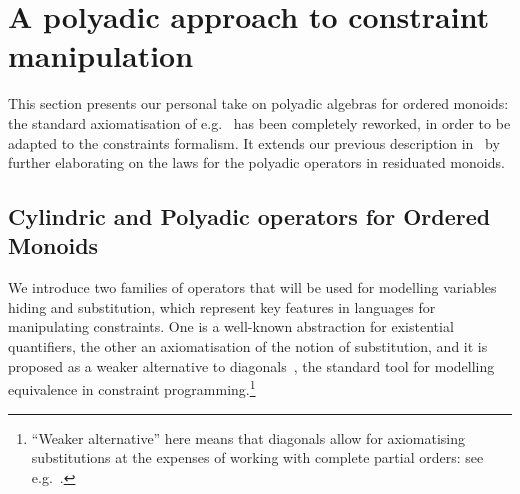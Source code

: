 \documentclass{llncs}
\newcommand{\comment}[1]{}
\def\odiv{\, {\ominus\hspace{-7.7pt} \div} \,}
\begin{document}
\comment{
\begin{example}
\label{notdistr}
Let us consider the monoid $S = \langle \{p,u,n,t\}, \otimes_s, u \rangle$ (with $t$ the top 
of three otherwise unrelated elements): 
$p$ and $n$ intuitively represent the sign of an integer, $t$ tells us that 
the sign cannot be determined, $u$ is the zero
and $\otimes_s$ (which is idempotent) tells us the sign of the addition of two integers, so that 
for all elements $x$ we have
\[x \otimes_s x = u \otimes_s x = x \mbox{  and  } t \otimes_s x = p \otimes_s n = t\]
%
We now add the bottom, in order to obtain a complete lattice.
The $\otimes_s$ is extended in the expected way,  so that $\bot$ is absorbing.
%
Intuitively, $\bot$ states that an element is unsigned:
a pattern the reader familiar with abstract interpretation formalisms will recognise.

The resulting semi-lattice monoid is residuated, with $\odiv$ defined as

$$x \odiv y = \bigg \{\begin{array}{ll}
	t & y \leq x \\
	\bot & \ otherwise
	\end{array}$$
%
Thus, $\odiv$ does not distribute, since 
$\bigvee \{p \odiv n, u \odiv n\}  = \bot < \bigvee \{p, u\} \odiv n = t \odiv n = t$.
\end{example}
}

\section{A polyadic approach to constraint manipulation}\label{sec:newconstraint}

This section presents our personal take on polyadic algebras for ordered monoids:
the standard axiomatisation of e.g.~\cite{sagi2013} has been completely 
reworked, in order to be adapted to the constraints formalism.
%
It extends our previous description in~\cite{festcatuscia} by 
further elaborating on the laws for the polyadic operators in residuated monoids.

\subsection{Cylindric and Polyadic operators for Ordered Monoids}
\label{cypo}
We  introduce two families of operators 
that will be used
for modelling variables hiding and substitution, which represent
key features in languages for manipulating constraints.
%
One is a well-known abstraction for existential quantifiers,
the other an axiomatisation of the notion of
substitution, and it is proposed as a weaker  alternative 
to diagonals~\cite{popl91}, the standard tool for modelling 
equivalence in constraint programming.\footnote{``Weaker 
alternative'' here means that diagonals allow for axiomatising
substitutions at the expenses of working with complete
partial orders: see e.g.~\cite[Definition 11]{jlamp17}.}
%
\end{document}
